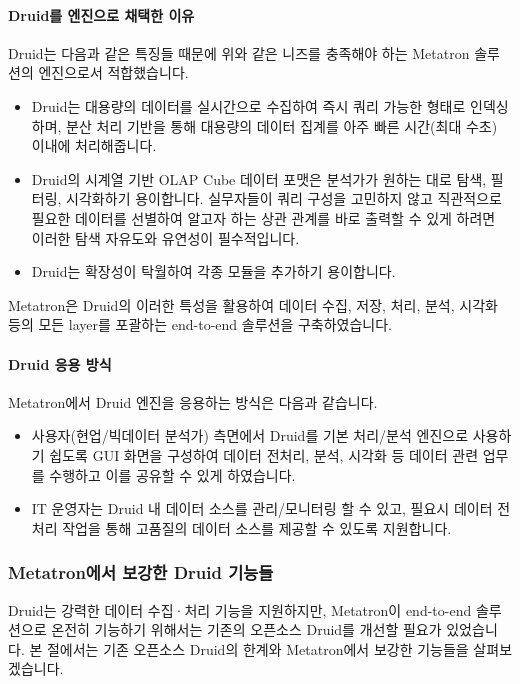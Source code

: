 \documentclass[letterpaper,10pt,english]{sphinxmanual}
\begin{document}
\paragraph{Druid를 엔진으로 채택한 이유}
\label{\detokenize{discovery/part01/druid_to_metatron:druid}}
Druid는 다음과 같은 특징들 때문에 위와 같은 니즈를 충족해야 하는 Metatron 솔루션의 엔진으로서 적합했습니다.
\begin{itemize}
\item {} 
Druid는 대용량의 데이터를 실시간으로 수집하여 즉시 쿼리 가능한 형태로 인덱싱하며, 분산 처리 기반을 통해 대용량의 데이터 집계를 아주 빠른 시간(최대 수초) 이내에 처리해줍니다.

\item {} 
Druid의 시계열 기반 OLAP Cube 데이터 포맷은 분석가가 원하는 대로 탐색, 필터링, 시각화하기 용이합니다. 실무자들이 쿼리 구성을 고민하지 않고 직관적으로 필요한 데이터를 선별하여 알고자 하는 상관 관계를 바로 출력할 수 있게 하려면 이러한 탐색 자유도와 유연성이 필수적입니다.

\item {} 
Druid는 확장성이 탁월하여 각종 모듈을 추가하기 용이합니다.

\end{itemize}

Metatron은 Druid의 이러한 특성을 활용하여 데이터 수집, 저장, 처리, 분석, 시각화 등의 모든 layer를 포괄하는 end-to-end 솔루션을 구축하였습니다.


\paragraph{Druid 응용 방식}
\label{\detokenize{discovery/part01/druid_to_metatron:id2}}
Metatron에서 Druid 엔진을 응용하는 방식은 다음과 같습니다.
\begin{itemize}
\item {} 
사용자(현업/빅데이터 분석가) 측면에서 Druid를 기본 처리/분석 엔진으로 사용하기 쉽도록 GUI 화면을 구성하여 데이터 전처리, 분석, 시각화 등 데이터 관련 업무를 수행하고 이를 공유할 수 있게 하였습니다.

\item {} 
IT 운영자는 Druid 내 데이터 소스를 관리/모니터링 할 수 있고, 필요시 데이터 전처리 작업을 통해 고품질의 데이터 소스를 제공할 수 있도록 지원합니다.

\end{itemize}


\subsubsection{Metatron에서 보강한 Druid 기능들}
\label{\detokenize{discovery/part01/druid_to_metatron:id3}}
Druid는 강력한 데이터 수집·처리 기능을 지원하지만, Metatron이 end-to-end 솔루션으로 온전히 기능하기 위해서는 기존의 오픈소스 Druid를 개선할 필요가 있었습니다. 본 절에서는 기존 오픈소스 Druid의 한계와 Metatron에서 보강한 기능들을 살펴보겠습니다.
\end{document}
